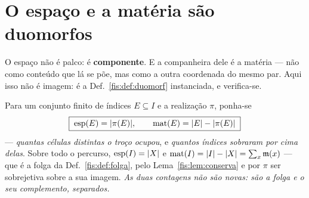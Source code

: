\documentclass[livro.tex]{subfiles}
\begin{document}
\section{O espaço e a matéria são duomorfos}\label{fis:topo-duoesp}

\noindent O espaço não é palco: é \textbf{componente}. E a companheira dele é a
matéria --- não como conteúdo que lá se põe, mas como a outra coordenada do mesmo
par. Aqui isso não é imagem: é a Def.~\ref{fis:def:duomorf} instanciada, e
verifica-se.

\begin{definicao}\label{fis:def:espmat}
Para um conjunto finito de índices $E\subseteq I$ e a realização $\pi$, ponha-se
\[
\boxed{\;\operatorname{esp}(E)=\lvert \pi(E)\rvert,\qquad
\operatorname{mat}(E)=\lvert E\rvert-\lvert \pi(E)\rvert\;}
\]
--- \emph{quantas células distintas o troço ocupou}, e \emph{quantos índices
sobraram por cima delas}. Sobre todo o percurso, $\operatorname{esp}(I)=\lvert X\rvert$
e $\operatorname{mat}(I)=\lvert I\rvert-\lvert X\rvert=\sum_x\mathfrak{m}(x)$ --- que é a folga
da Def.~\ref{fis:def:folga}, pelo Lema~\ref{fis:lem:conserva} e por $\pi$ ser
sobrejetiva sobre a sua imagem. \emph{As duas contagens não são novas: são a
folga e o seu complemento, separados.}
\end{definicao}
\end{document}
